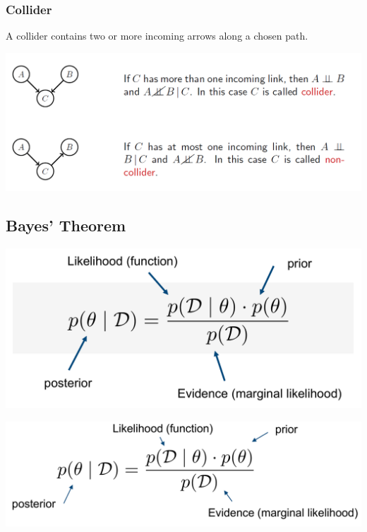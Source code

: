 \documentclass[11pt]{article}
\theoremstyle{definition}
\begin{document}
\subsubsection{Collider}
A collider contains two or more incoming arrows along a chosen path.
\begin{center}
	\includegraphics[width=0.8\linewidth]{img/conditional_independence_collider}
\end{center}

\subsection{Bayes' Theorem}
\begin{center}
	\includegraphics[width=0.6\linewidth]{img/bayes_theorem}
\end{center}

\begin{center}
	\includegraphics[width=0.7\linewidth]{img/bayes_theorem_descriptions}
\end{center}
\end{document}

